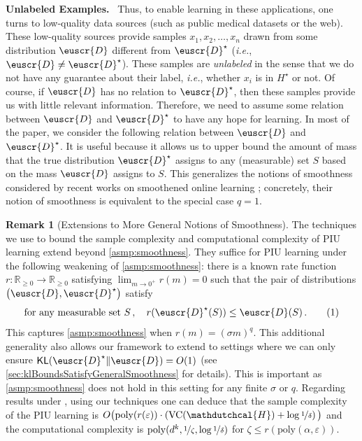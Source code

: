 \documentclass[11pt]{article}
\makeatletter
\theoremstyle{plain}
\theoremstyle{definition}
\newtheorem{remark}[theorem]{Remark}
\theoremstyle{remark}
\newcommand{\yesnum}{\addtocounter{equation}{1}\tag{\theequation}}
\renewcommand{\eqref}[1]{\textup{\eqrefform@{\ref{#1}}}}
\let\eqrefform@\tagform@
\newcommand{\sinparen}[1]{(#1)}
\newcommand{\binparen}[1]{\big(#1\big)}
\newcommand{\inparen}[1]{\left(#1\right)}
\newcommand{\R}{\mathbb{R}}
\newcommand{\kl}[2]{\operatornamewithlimits{\mathsf{KL}}\sinparen{#1\|#2}}
\newcommand{\nfrac}[2]{\nicefrac{#1}{#2}}
\newcommand{\poly}{\mathrm{poly}}
\newcommand{\vc}{\textrm{\rm VC}}
\newcommand{\eps}{\varepsilon}
\newcommand{\customcal}[1]{\euscr{#1}}
\newcommand{\cD}{\customcal{D}}
\renewcommand{\paragraph}[1]{\medskip \noindent\textbf{#1}~}
\newcommand{\ie}{\textit{i.e.}}
\newcommand{\hypo}[1]{\mathdutchcal{#1}}
\newcommand{\hyH}{\hypo{H}}
\newcommand{\optset}{{H^\star}}
\newcommand{\cDtrue}{\cD^\star}
\newcommand{\cDgiven}{\cD}
\makeatother
\begin{document}
        \paragraph{Unlabeled Examples.}
            Thus, to enable learning in these applications, one turns to low-quality data sources (such as public medical datasets or the web).
            These low-quality sources provide samples $x_1,x_2,\dots,x_n$ drawn from some distribution $\cDgiven$ different from $\cDtrue$ (\ie{}, $\cDgiven\neq \cDtrue$).
            These samples are \emph{unlabeled} in the sense that we do not have any guarantee about their label, \ie{}, whether $x_i$ is in $\optset$ or not.
            Of course, if $\cDgiven$ has no relation to $\cDtrue$, then these samples provide us with little relevant information.
            Therefore, we need to assume some relation between $\cDgiven$ and $\cDtrue$ to have any hope for learning.
            In most of the paper, we consider the following relation between $\cDgiven$ and $\cDtrue$.
            \smoothness*
            \noindent 
            It is useful because it allows us to upper bound the amount of mass that the true distribution $\cDtrue$ assigns to any {(measurable)} set $S$ based on the mass $\cDgiven$ assigns to $S$.
            This generalizes the notions of smoothness considered by recent works on smoothened online learning \cite{haghtalab2020smooth,haghtalab2021smooth,haghtalab2022efficientSmooth,haghtalab2024smoothJACM,blanchard2024agnostic}; concretely, their notion of smoothness is equivalent to the special case $q=1$.


            \begin{remark}[Extensions to More General Notions of Smoothness]
                \label{rem:generalSmoothness}
                The techniques we use to bound the sample complexity and computational complexity of PIU learning extend beyond \cref{asmp:smoothness}.
                They suffice for PIU learning under the following weakening of \cref{asmp:smoothness}:
                there is a known rate function $r\colon \R_{\geq 0}\to \R_{\geq 0}$ satisfying $\lim_{m\to 0^+} r(m)=0$ such that the pair of distributions $\inparen{\cD, \cDtrue}$ satisfy
                \[
                    \text{for any measurable set $S$}\,,\quad 
                    r(\cDtrue(S))\leq \cD(S)\,.
                    \yesnum\label{eq:mostGeneral:smoothness}
                \]
                This captures \cref{asmp:smoothness} when $r(m)=(\sigma m)^{q}$.
                This additional generality also allows our framework to extend to settings where we can only ensure $\kl{\cDtrue}{\cD}=O(1)$ (see \cref{sec:klBoundsSatisfyGeneralSmoothness} for details).
                This is important as \cref{asmp:smoothness} does not hold in this setting for any finite $\sigma$ or $q$.
                Regarding results under \eqref{eq:mostGeneral:smoothness}, using our techniques one can deduce that the sample complexity of the PIU learning is $O\binparen{\poly{(r(\eps))}\cdot \inparen{\vc{}(\hyH)+\log{\nfrac{1}{\delta}}}}$ and the computational complexity is $\poly(d^k,\nfrac{1}{\zeta},\log{\nfrac{1}{\delta}})$ for $\zeta\leq r(\poly(\alpha,\eps))$.
            \end{remark}
            
\end{document}
